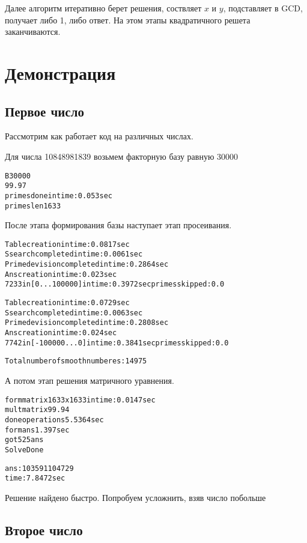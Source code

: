 Далее алгоритм итеративно берет решения, соствляет $x$ и $y$, подставляет в GCD, получает либо 1, либо ответ. На этом этапы квадратичного решета заканчиваются.

\section{Демонстрация}

\subsection{Первое число}

Рассмотрим как работает код на различных числах.

Для числа 10848981839 возьмем факторную базу равную 30000

\begin{alltt}
B 30000
99.97 %
primes done in time: 0.053 sec
primes len 1633
\end{alltt}

После этапа формирования базы наступает этап просеивания.

\begin{alltt}
Table creation in time: 0.0817 sec
S search completed in time: 0.0061 sec
Prime devision completed in time: 0.2864 sec
Ans creation in time: 0.023 sec
7233 in [0...100000] in time: 0.3972 sec primes skipped: 0.0 %

Table creation in time: 0.0729 sec
S search completed in time: 0.0063 sec
Prime devision completed in time: 0.2808 sec
Ans creation in time: 0.024 sec
7742 in [-100000...0] in time: 0.3841 sec primes skipped: 0.0 %

Total number of smooth numberes: 14975
\end{alltt}

А потом этап решения матричного уравнения.

\begin{alltt}
form matrix 1633 x 1633 in time: 0.0147 sec
mult matrix 99.94 %
done operations 5.5364 sec
form ans 1.397 sec
got 525 ans
Solve Done

ans: 103591 104729
time: 7.8472 sec
\end{alltt}

Решение найдено быстро. Попробуем усложнить, взяв число побольше

\subsection{Второе число}

